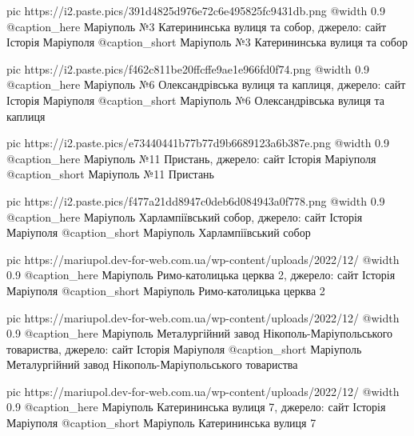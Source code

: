   pic https://i2.paste.pics/391d4825d976e72c6e495825fc9431db.png
  @width 0.9
  @caption_here Маріуполь №3 Катерининська вулиця та собор, джерело: сайт Історія Маріуполя
  @caption_short Маріуполь №3 Катерининська вулиця та собор

  pic https://i2.paste.pics/f462c811be20ffcffe9ae1e966fd0f74.png
  @width 0.9
  @caption_here Маріуполь №6 Олександрівська вулиця та каплиця, джерело: сайт Історія Маріуполя
  @caption_short Маріуполь №6 Олександрівська вулиця та каплиця

  pic https://i2.paste.pics/e73440441b77b77d9b6689123a6b387e.png
  @width 0.9
  @caption_here Маріуполь №11 Пристань, джерело: сайт Історія Маріуполя
  @caption_short Маріуполь №11 Пристань

  pic https://i2.paste.pics/f477a21dd8947c0deb6d084943a0f778.png
  @width 0.9
  @caption_here Маріуполь Харлампіївський собор, джерело: сайт Історія Маріуполя
  @caption_short Маріуполь Харлампіївський собор

  pic https://mariupol.dev-for-web.com.ua/wp-content/uploads/2022/12/%
  @width 0.9
  @caption_here Маріуполь Римо-католицька церква 2, джерело: сайт Історія Маріуполя
  @caption_short Маріуполь Римо-католицька церква 2

  pic https://mariupol.dev-for-web.com.ua/wp-content/uploads/2022/12/%
  @width 0.9
  @caption_here Маріуполь Металургійний завод Нікополь-Маріупольського товариства, джерело: сайт Історія Маріуполя
  @caption_short Маріуполь Металургійний завод Нікополь-Маріупольського товариства

  pic https://mariupol.dev-for-web.com.ua/wp-content/uploads/2022/12/%
  @width 0.9
  @caption_here Маріуполь Катерининська вулиця 7, джерело: сайт Історія Маріуполя
  @caption_short Маріуполь Катерининська вулиця 7

